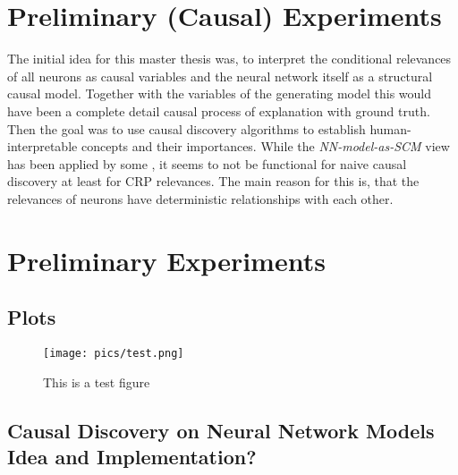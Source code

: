{ \color{gray}
\section{Preliminary (Causal) Experiments}
The initial idea for this master thesis was, to interpret the conditional relevances of all neurons as causal variables and the neural network itself as a structural causal model. Together with the variables of the generating model this would have been a complete detail causal process of explanation with ground truth. Then the goal was to use causal discovery algorithms to establish human-interpretable concepts and their importances. While the \textit{NN-model-as-SCM} view has been applied by some \cite{Narendra2018,Chattopadhyay2019}, it seems to not be functional for naive causal discovery at least for CRP relevances. The main reason for this is, that the relevances of neurons have deterministic relationships with each other. 


\section{Preliminary Experiments}
\subsection{Plots}
\begin{figure}[ht]
	\centering
	\label{fig:blafigure}
	\texttt{[image: pics/test.png]}
	\caption[Test Figure 2]{This is a test figure}
\end{figure}
\subsection{Causal Discovery on Neural Network Models Idea and Implementation?}
} 